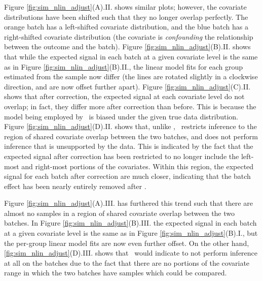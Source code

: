 Figure \ref{fig:sim_nlin_adjust}(A).II. shows similar plots; however, the covariate distributions have been shifted such that they no longer overlap perfectly. The orange batch has a left-shifted covariate distribution, and the blue batch has a right-shifted covariate distribution (the covariate is \textit{confounding} the relationship between the outcome and the batch). Figure \ref{fig:sim_nlin_adjust}(B).II. shows that while the expected signal in each batch at a given covariate level is the same as in Figure \ref{fig:sim_nlin_adjust}(B).II., the linear model fits for each group estimated from the sample now differ (the lines are rotated slightly in a clockwise direction, and are now offset further apart). Figure \ref{fig:sim_nlin_adjust}(C).II. shows that after correction, the expected signal at each covariate level do not overlap; in fact, they differ more after correction than before. This is because the model being employed by \ccombat~is biased under the given true data distribution. Figure \ref{fig:sim_nlin_adjust}(D).II. shows that, unlike \ccombat, \cccombat~restricts inference to the region of shared covariate overlap between the two batches, and does not perform inference that is unsupported by the data. This is indicated by the fact that the expected signal after correction has been restricted to no longer include the left-most and right-most portions of the covariates. Within this region, the expected signal for each batch after correction are much closer, indicating that the batch effect has been nearly entirely removed after \cccombat. 

Figure \ref{fig:sim_nlin_adjust}(A).III. has furthered this trend such that there are almost no samples in a region of shared covariate overlap between the two batches. In Figure \ref{fig:sim_nlin_adjust}(B).III. the expected signal in each batch at a given covariate level is the same as in Figure \ref{fig:sim_nlin_adjust}(B).I., but the per-group linear model fits are now even further offset.  On the other hand, \ref{fig:sim_nlin_adjust}(D).III. shows that \cccombat~would indicate to not perform inference at all on the batches due to the fact that there are no portions of the covariate range in which the two batches have samples which could be compared. 

